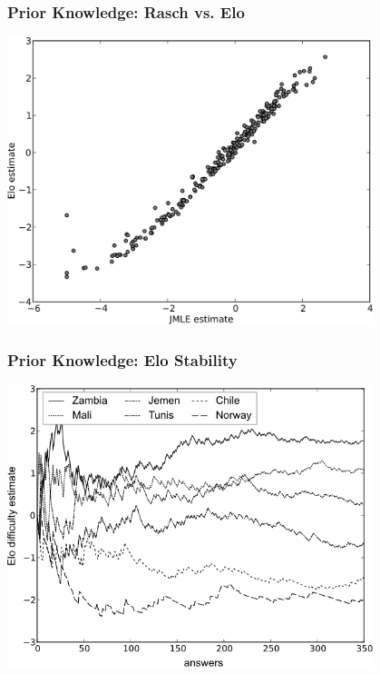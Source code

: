 \documentclass[xcolor=svgnames]{beamer}
\begin{document}
\begin{frame}
	\frametitle{Prior Knowledge: Rasch vs. Elo}
	\begin{center}
		\includegraphics[width=0.8\textwidth]{2014-IA068-adaptive-practice/elo-rasch-comparison.png}
	\end{center}
\end{frame}
\begin{frame}
	\frametitle{Prior Knowledge: Elo Stability}
	\begin{center}
		\includegraphics[width=0.8\textwidth]{2014-IA068-adaptive-practice/elo-history.png}
	\end{center}
\end{frame}
\end{document}
